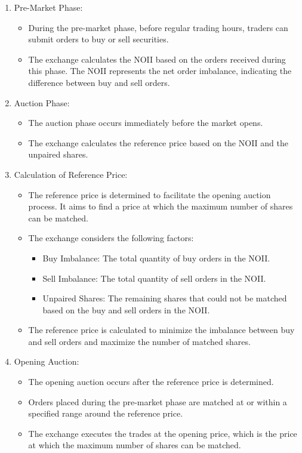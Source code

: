 \documentclass[11pt]{article}
\begin{document}
\begin{enumerate}
\item Pre-Market Phase:
\begin{itemize}
\item During the pre-market phase, before regular trading hours, traders can submit orders to buy or sell securities.
\item The exchange calculates the NOII based on the orders received during this phase.
The NOII represents the net order imbalance, indicating the difference between buy and sell orders.
\end{itemize}

\item Auction Phase:
\begin{itemize}
\item The auction phase occurs immediately before the market opens.
\item The exchange calculates the reference price based on the NOII and the unpaired shares.
\end{itemize}

\item Calculation of Reference Price:
\begin{itemize}
\item The reference price is determined to facilitate the opening auction process.
It aims to find a price at which the maximum number of shares can be matched.
\item The exchange considers the following factors:
\begin{itemize}
\item Buy Imbalance: The total quantity of buy orders in the NOII.
\item Sell Imbalance: The total quantity of sell orders in the NOII.
\item Unpaired Shares: The remaining shares that could not be matched based on the buy and sell orders in the NOII.
\end{itemize}
\item The reference price is calculated to minimize the imbalance between buy and sell orders and
maximize the number of matched shares.
\end{itemize}

\item Opening Auction:
\begin{itemize}
\item The opening auction occurs after the reference price is determined.
\item Orders placed during the pre-market phase are matched at or within a specified range around the reference price.
\item The exchange executes the trades at the opening price,
which is the price at which the maximum number of shares can be matched.
\end{itemize}


\end{enumerate}
\end{document}
